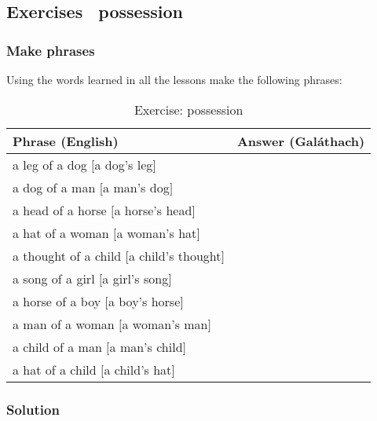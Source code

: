 \newpage
\subsection{Exercises \textendash\ possession}

\subsubsection{Make phrases}

Using the words learned in all the lessons make the following phrases:
\begin{table}[H]
\centering
\begin{tabular}{|l|M{10.0cm}|}
  \toprule
  \textbf{Phrase (English)} & \textbf{Answer (Gal\'{a}thach)}\\
  \toprule
  a leg of a dog $[$a dog's leg$]$ & \\
  \midrule
  a dog of a man $[$a man's dog$]$ & \\
  \midrule
  a head of a horse $[$a horse's head$]$ & \\
  \midrule
  a hat of a woman $[$a woman's hat$]$ & \\
  \midrule
  a thought of a child $[$a child's thought$]$ & \\
  \midrule
  a song of a girl $[$a girl's song$]$ & \\
  \midrule
  a horse of a boy $[$a boy's horse$]$ & \\
  \midrule
  a man of a woman $[$a woman's man$]$ & \\
  \midrule
  a child of a man $[$a man's child$]$ & \\
  \midrule
  a hat of a child $[$a child's hat$]$ & \\
  \bottomrule
\end{tabular}
\label{exercise_possession}
\caption{Exercise: possession}
\end{table}

\newpage
\subsubsection{Solution}

